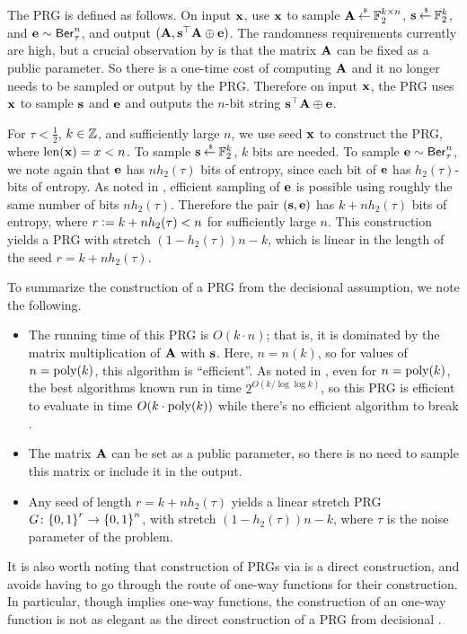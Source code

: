The PRG is defined as follows. 
On input ${\mathbf x}$, use ${\mathbf x}$ to sample ${\mathbf A} \mathbin{\stackrel{\mbox{\,\tiny \$}}{\gets}} {\mathbb F}_2^{k\times n}$, ${\mathbf s} \mathbin{\stackrel{\mbox{\,\tiny \$}}{\gets}} {\mathbb F}_2^k$, and ${\mathbf e} \sim \mathsf{Ber}_\tau^n$, and output $({\mathbf A}, {\mathbf s}^\top{\mathbf A}\oplus{\mathbf e})$.
The randomness requirements currently are high, but a crucial observation by \cite{C:ACPS09} is that the matrix ${\mathbf A}$ can be fixed as a public parameter.
So there is a one-time cost of computing ${\mathbf A}$ and it no longer needs to be sampled or output by the PRG.
Therefore on input ${\mathbf x}$, the PRG uses ${\mathbf x}$ to sample ${\mathbf s}$ and ${\mathbf e}$ and outputs the $n$-bit string ${\mathbf s}^\top{\mathbf A}\oplus{\mathbf e}$.

For $\tau < \frac{1}{2}$, $k \in {\mathbb Z}$, and sufficiently large $n$, we use seed ${\mathbf x}$ to construct the PRG, where $\mathrm{len}({\mathbf x}) = x < n$.
To sample ${\mathbf s} \mathbin{\stackrel{\mbox{\,\tiny \$}}{\gets}} {\mathbb F}_2^k$, $k$ bits are needed.
To sample ${\mathbf e}\sim\mathsf{Ber}_\tau^n$, we note again that ${\mathbf e}$ has $nh_2(\tau)$ bits of entropy, since each bit of ${\mathbf e}$ has $h_2(\tau)$-bits of entropy.
As noted in \cite{C:ACPS09}, efficient sampling of ${\mathbf e}$ is possible using roughly the same number of bits $nh_2(\tau)$.
Therefore the pair $({\mathbf s},{\mathbf e})$ has $k+nh_2(\tau)$ bits of entropy, where $r{\;\vcentcolon=\;} k+nh_2(\tau) < n$ for sufficiently large $n$.
This construction yields a PRG with stretch $(1 - h_2(\tau))n-k$, which is linear in the length of the seed $r = k+nh_2(\tau)$.

To summarize the construction of a PRG from the decisional \LPN assumption, we note the following.
\begin{itemize}
	\item The running time of this PRG is $O(k\cdot n)$; that is, it is dominated by the matrix multiplication of ${\mathbf A}$ with ${\mathbf s}$.
	Here, $n = n(k)$, so for values of $n = \operatorname{poly}(k)$, this algorithm is ``efficient''.
	As noted in , even for $n = \operatorname{poly}(k)$, the best algorithms known run in time $2^{O(k/\log\log k)}$, so this PRG is efficient to evaluate in time $O(k\cdot\operatorname{poly}(k))$ while there's no efficient algorithm to break \LPN.
	\item The matrix ${\mathbf A}$ can be set as a public parameter, so there is no need to sample this matrix or include it in the output.
	\item Any seed of length $r = k + nh_2(\tau)$ yields a linear stretch PRG $G \colon {\{0,1\}}^r \rightarrow {\{0,1\}}^n$, with stretch $(1-h_2(\tau))n - k$, where $\tau$ is the noise parameter of the \LPN problem.
\end{itemize}
It is also worth noting that construction of PRGs via \LPN is a direct construction, and avoids having to go through the route of one-way functions for their construction.
In particular, though \LPN implies one-way functions, the construction of an \LPN one-way function is not as elegant as the direct construction of a PRG from decisional \LPN.



